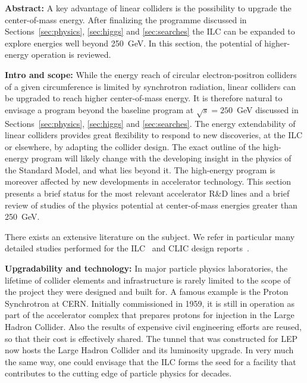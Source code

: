 


{\bf Abstract:} A key advantage of linear colliders is the possibility to upgrade
the center-of-mass energy. After finalizing the programme discussed in
Sections~\ref{sec:physics}, \ref{sec:higgs} and \ref{sec:searches} the ILC can
be expanded to explore energies well beyond 250~GeV{}. In this section, the
potential of higher-energy operation is reviewed.

{\bf Intro and scope:} While the energy reach of circular electron-positron
colliders of a given circumference is limited by synchrotron radiation,
linear colliders can be upgraded to reach higher center-of-mass energy.
It is therefore natural to envisage a program beyond the baseline program
at $\sqrt{s}= 250$~GeV discussed in Sections~\ref{sec:physics}, \ref{sec:higgs}
and \ref{sec:searches}. The energy extendability of linear colliders
provides great flexibility to respond to new discoveries, at the ILC or elsewhere,
by adapting the collider design. The exact outline of the high-energy
program will likely change with the developing insight in the physics of the Standard Model,
and what lies beyond it. The high-energy program is moreover affected by new developments
in accelerator technology. This section presents a brief status for the most relevant
accelerator R\&D lines and a brief review of studies of the physics potential at
center-of-mass energies greater than 250~GeV.  

There exists an extensive literature on the subject. We refer in particular
many detailed studies performed for the ILC~\cite{Fujii:2015jha,Baer:2013cma}
and CLIC design reports~\cite{Linssen:2012hp}.


{\bf Upgradability and technology:}
In major particle physics laboratories, the lifetime of collider elements
and infrastructure is rarely limited to the scope of the project they were
designed and built for. A famous example is the Proton Synchrotron at CERN.
Initially commissioned in 1959, it is still in operation as
part of the accelerator complex that prepares protons for injection in the
Large Hadron Collider. Also the results of expensive civil engineering
efforts are reused, so that their cost is effectively shared. The tunnel
that was constructed for LEP now hosts the Large Hadron Collider and its
luminosity upgrade. In very much the same way, one could
envisage that the ILC forms the seed for a facility that contributes to the
cutting edge of particle physics for decades.

